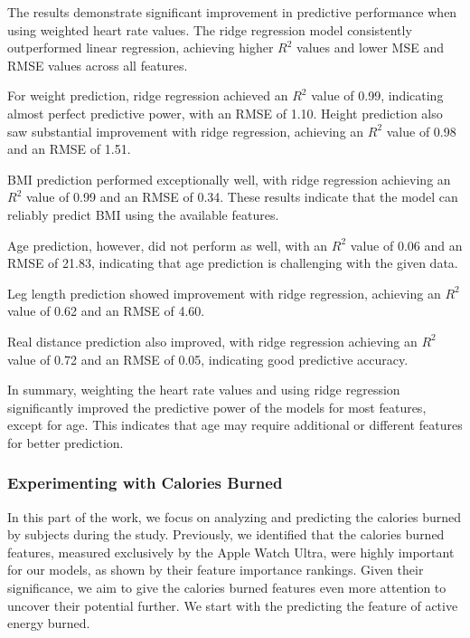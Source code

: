 The results demonstrate significant improvement in predictive performance when using weighted heart rate values. The ridge regression model consistently outperformed linear regression, achieving higher \(R^2\) values and lower MSE and RMSE values across all features.

For weight prediction, ridge regression achieved an \(R^2\) value of 0.99, indicating almost perfect predictive power, with an RMSE of 1.10. Height prediction also saw substantial improvement with ridge regression, achieving an \(R^2\) value of 0.98 and an RMSE of 1.51.

BMI prediction performed exceptionally well, with ridge regression achieving an \(R^2\) value of 0.99 and an RMSE of 0.34. These results indicate that the model can reliably predict BMI using the available features.

Age prediction, however, did not perform as well, with an \(R^2\) value of 0.06 and an RMSE of 21.83, indicating that age prediction is challenging with the given data.

Leg length prediction showed improvement with ridge regression, achieving an \(R^2\) value of 0.62 and an RMSE of 4.60.

Real distance prediction also improved, with ridge regression achieving an \(R^2\) value of 0.72 and an RMSE of 0.05, indicating good predictive accuracy.

In summary, weighting the heart rate values and using ridge regression significantly improved the predictive power of the models for most features, except for age. This indicates that age may require additional or different features for better prediction.

\subsubsection{Experimenting with Calories Burned}

In this part of the work, we focus on analyzing and predicting the calories burned by subjects during the study. Previously, we identified that the calories burned features, measured exclusively by the Apple Watch Ultra, were highly important for our models, as shown by their feature importance rankings. Given their significance, we aim to give the calories burned features even more attention to uncover their potential further. We start with the predicting the feature of active energy burned.

